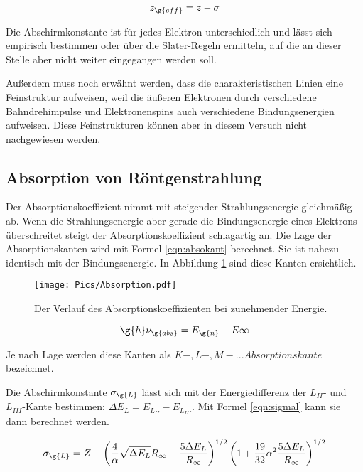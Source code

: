 \begin{equation}
  z_{\g{eff}} = z - \sigma
  \label{eqn:zeff}
\end{equation}

Die Abschirmkonstante ist für jedes Elektron unterschiedlich und lässt sich empirisch
bestimmen oder über die Slater-Regeln ermitteln, auf die an dieser Stelle aber nicht
weiter eingegangen werden soll.

Außerdem muss noch erwähnt werden, dass die charakteristischen Linien eine Feinstruktur
aufweisen, weil die äußeren Elektronen durch verschiedene Bahndrehimpulse und Elektronenspins
auch verschiedene Bindungsenergien aufweisen. Diese Feinstrukturen können aber in diesem Versuch nicht nachgewiesen
werden.

\subsection{Absorption von Röntgenstrahlung}

Der Absorptionskoeffizient nimmt mit steigender Strahlungsenergie gleichmäßig ab. Wenn die
Strahlungsenergie aber gerade die Bindungsenergie eines Elektrons überschreitet steigt der
Absorptionskoeffizient schlagartig an.
Die Lage der Absorptionskanten wird mit Formel \eqref{eqn:absokant} berechnet. Sie ist nahezu
identisch mit der Bindungsenergie. In Abbildung \ref{fig:absokant} sind diese Kanten
ersichtlich.

\begin{figure}
  \centering
  \texttt{[image: Pics/Absorption.pdf]}
  \caption{Der Verlauf des Absorptionskoeffizienten bei zunehmender Energie. \cite{anleitung}}
  \label{fig:absokant}
\end{figure}

\begin{equation}
  \g{h} \nu_{\g{abs}} = E_{\g{n}} - E{\infty}
  \label{eqn:absokant}
\end{equation}

Je nach Lage werden diese Kanten als $K-,L-,M-...Absorptionskante$ bezeichnet.

Die Abschirmkonstante $\sigma_{\g{L}}$ lässt sich mit der Energiedifferenz der $L_{II}$-
und $L_{III}$-Kante bestimmen: $\Delta E_{L} = E_{L_{II}} - E_{L_{III}}$.
Mit Formel \eqref{eqn:sigmal} kann sie dann berechnet werden.

\begin{equation}
  \sigma_{\g{L}} = Z - \left(\frac{4}{\alpha} \sqrt{\Delta E_{L}} R_{\infty} -
  \frac{5 \Delta E_{L}}{R_{\infty}} \right)^{1/2} \left(1 + \frac{19}{32} \alpha^2 \frac{5 \Delta E_{L}}{R_{\infty}} \right)^{1/2}
  \label{eqn:sigmal}
\end{equation}

